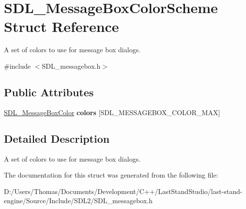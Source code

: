 \hypertarget{structSDL__MessageBoxColorScheme}{}\section{S\+D\+L\+\_\+\+Message\+Box\+Color\+Scheme Struct Reference}
\label{structSDL__MessageBoxColorScheme}


A set of colors to use for message box dialogs.  




{\ttfamily \#include $<$S\+D\+L\+\_\+messagebox.\+h$>$}

\subsection*{Public Attributes}
\begin{DoxyCompactItemize}
\item 
\hypertarget{structSDL__MessageBoxColorScheme_ae3712ec81e41b63b781b7d49d3b3b8f6}{}\hyperlink{structSDL__MessageBoxColor}{S\+D\+L\+\_\+\+Message\+Box\+Color} {\bfseries colors} \mbox{[}S\+D\+L\+\_\+\+M\+E\+S\+S\+A\+G\+E\+B\+O\+X\+\_\+\+C\+O\+L\+O\+R\+\_\+\+M\+A\+X\mbox{]}\label{structSDL__MessageBoxColorScheme_ae3712ec81e41b63b781b7d49d3b3b8f6}

\end{DoxyCompactItemize}


\subsection{Detailed Description}
A set of colors to use for message box dialogs. 

The documentation for this struct was generated from the following file\+:\begin{DoxyCompactItemize}
\item 
D\+:/\+Users/\+Thomas/\+Documents/\+Development/\+C++/\+Last\+Stand\+Studio/last-\/stand-\/engine/\+Source/\+Include/\+S\+D\+L2/S\+D\+L\+\_\+messagebox.\+h\end{DoxyCompactItemize}
